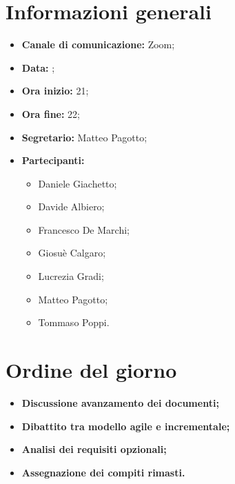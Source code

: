 \section{Informazioni generali}

\begin{itemize}

	\item \textbf{Canale di comunicazione:} Zoom;
	
	\item \textbf{Data:} \DataMeeting{};
	
	\item \textbf{Ora inizio:} 21;
	
	\item \textbf{Ora fine:} 22;
	
	\item \textbf{Segretario:} Matteo Pagotto;
	
	\item \textbf{Partecipanti:}
	
		\begin{itemize}
		
			\item Daniele Giachetto;
			\item Davide Albiero;
			\item Francesco De Marchi;
			\item Giosuè Calgaro;
			\item Lucrezia Gradi;
			\item Matteo Pagotto;
			\item Tommaso Poppi.

		\end{itemize}

\end{itemize}

\section{Ordine del giorno}

\begin{itemize}

	
	
	\item\textbf{Discussione avanzamento dei documenti;}
	
	\item\textbf{Dibattito tra modello agile e incrementale;}
	
	\item\textbf{Analisi dei requisiti opzionali;}

	\item\textbf{Assegnazione dei compiti rimasti.}

\end{itemize}

